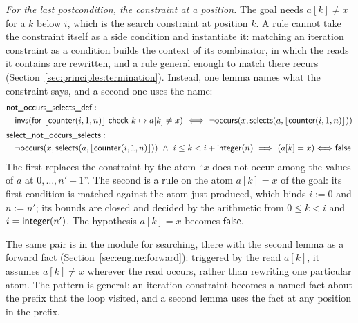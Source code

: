 \emph{For the last postcondition, the constraint at a position.} The goal needs $a[k] \ne x$ for a $k$ below
$i$, which is the search constraint at position $k$. A rule cannot take the constraint itself as a side
condition and instantiate it: matching an iteration constraint as a condition builds the context of its
combinator, in which the reads it contains are rewritten, and a rule general enough to match there recurs
(Section~\ref{sec:principles:termination}). Instead, one lemma names what the constraint says, and a second one
uses the name:
\begin{align*}
  &\lemma{not\_occurs\_selects\_def}:\\
  &\quad \al{\bl{\cnt(i, 1, n)}}{k \mapsto a[k] \ne x}\ \Longleftrightarrow\ \neg\mathsf{occurs}(x, \mathsf{selects}(a, \bl{\cnt(i, 1, n)}))\\[2pt]
  &\lemma{select\_not\_occurs\_selects}:\\
  &\quad \neg\mathsf{occurs}(x, \mathsf{selects}(a, \bl{\cnt(i, 1, n)}))\ \wedge\ i \le k < i + \intf(n)
    \ \Longrightarrow\ (a[k] = x) \Longleftrightarrow \mathsf{false}
\end{align*}
The first replaces the constraint by the atom ``$x$ does not occur among the values of $a$ at
$0, \ldots, n' - 1$''. The second is a rule on the atom $a[k] = x$ of the goal: its first condition is matched
against the atom just produced, which binds $i := 0$ and $n := n'$; its bounds are closed and decided by the
arithmetic from $0 \le k < i$ and $i = \mathsf{integer}(n')$. The hypothesis $a[k] = x$ becomes $\mathsf{false}$.

The same pair is in the module for searching, there with the second lemma as a forward fact
(Section~\ref{sec:engine:forward}): triggered by the read $a[k]$, it assumes $a[k] \ne x$ wherever the read
occurs, rather than rewriting one particular atom. The pattern is general: an iteration constraint becomes a
named fact about the prefix that the loop visited, and a second lemma uses the fact at any position in the
prefix.
